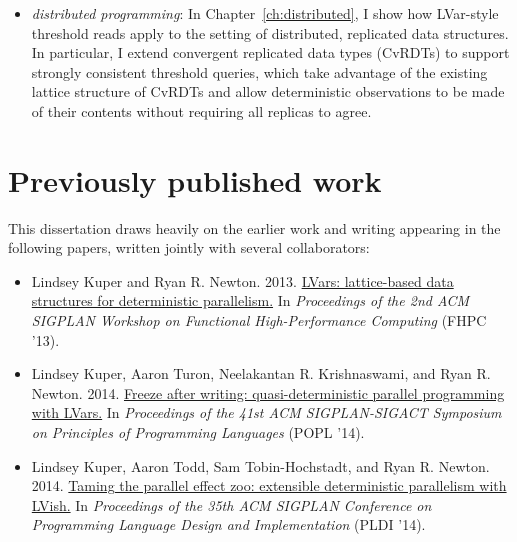 \begin{itemize}
  \item \emph{distributed programming}: In
    Chapter~\ref{ch:distributed}, I show how LVar-style threshold
    reads apply to the setting of distributed, replicated data
    structures.  In particular, I extend convergent replicated data
    types (CvRDTs) to support strongly consistent threshold queries,
    which take advantage of the existing lattice structure of CvRDTs
    and allow deterministic observations to be made of their contents
    without requiring all replicas to agree.
\end{itemize}

\section{Previously published work}

This dissertation draws heavily on the earlier work and writing
appearing in the following papers, written jointly with several
collaborators:

\begin{itemize}
\item Lindsey Kuper and Ryan
  R. Newton. 2013. \href{http://doi.acm.org/10.1145/2502323.2502326}{LVars:
    lattice-based data structures for deterministic parallelism.} In
  \emph{Proceedings of the 2nd ACM SIGPLAN Workshop on Functional
    High-Performance Computing} (FHPC '13).

\item Lindsey Kuper, Aaron Turon, Neelakantan R. Krishnaswami, and
  Ryan
  R. Newton. 2014. \href{http://doi.acm.org/10.1145/2535838.2535842
  }{Freeze after writing: quasi-deterministic parallel programming
    with LVars.} In \emph{Proceedings of the 41st ACM SIGPLAN-SIGACT
    Symposium on Principles of Programming Languages} (POPL '14).

\item Lindsey Kuper, Aaron Todd, Sam Tobin-Hochstadt, and Ryan
  R. Newton. 2014. \href{http://doi.acm.org/10.1145/2594291.2594312
  }{Taming the parallel effect zoo: extensible deterministic
    parallelism with LVish.} In \emph{Proceedings of the 35th ACM
    SIGPLAN Conference on Programming Language Design and
    Implementation} (PLDI '14).

\end{itemize}

